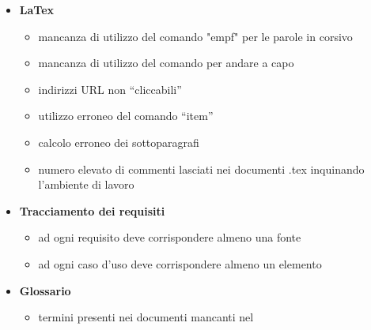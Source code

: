 \begin{itemize}
\item \textbf{LaTex}

	\begin{itemize}
	
	\item mancanza di utilizzo del comando "empf" per le parole in corsivo
	\item mancanza di utilizzo del comando per andare a capo
	\item indirizzi URL non “cliccabili”
	\item utilizzo erroneo del comando “item”
	\item calcolo erroneo dei sottoparagrafi
	\item numero elevato di commenti lasciati nei documenti .tex inquinando l'ambiente di lavoro
	
	\end{itemize}



\item \textbf{Tracciamento dei requisiti}

	\begin{itemize}
	\item ad ogni requisito deve corrispondere almeno una fonte
	\item ad ogni caso d’uso deve corrispondere almeno un elemento
	\end{itemize}


\item \textbf{Glossario}

	\begin{itemize}
	\item termini presenti nei documenti mancanti nel \gloss
	\end{itemize}



\end{itemize}






































